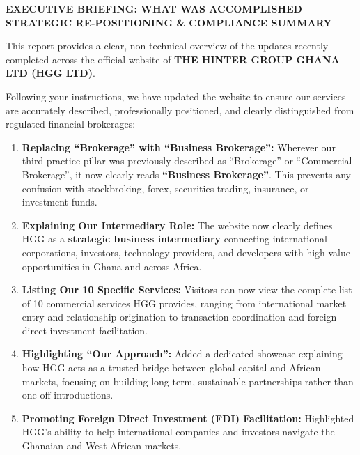 \documentclass[11pt,a4paper]{article}
\begin{document}
\begin{ExecutiveSummaryBox}
\begin{center}
    {\large\bfseries\color{HGGNavy}EXECUTIVE BRIEFING: WHAT WAS ACCOMPLISHED}\\[0.08cm]
    {\small\bfseries\color{HGGGold}STRATEGIC RE-POSITIONING \& COMPLIANCE SUMMARY}
\end{center}
\vspace{0.15cm}
This report provides a clear, non-technical overview of the updates recently completed across the official website of \textbf{THE HINTER GROUP GHANA LTD (HGG LTD)}.

Following your instructions, we have updated the website to ensure our services are accurately described, professionally positioned, and clearly distinguished from regulated financial brokerages:
\begin{enumerate}[leftmargin=*,noitemsep,topsep=2pt]
    \item \textbf{Replacing ``Brokerage'' with ``Business Brokerage'':} Wherever our third practice pillar was previously described as ``Brokerage'' or ``Commercial Brokerage'', it now clearly reads \textbf{``Business Brokerage''}. This prevents any confusion with stockbroking, forex, securities trading, insurance, or investment funds.
    \item \textbf{Explaining Our Intermediary Role:} The website now clearly defines HGG as a \textbf{strategic business intermediary} connecting international corporations, investors, technology providers, and developers with high-value opportunities in Ghana and across Africa.
    \item \textbf{Listing Our 10 Specific Services:} Visitors can now view the complete list of 10 commercial services HGG provides, ranging from international market entry and relationship origination to transaction coordination and foreign direct investment facilitation.
    \item \textbf{Highlighting ``Our Approach'':} Added a dedicated showcase explaining how HGG acts as a trusted bridge between global capital and African markets, focusing on building long-term, sustainable partnerships rather than one-off introductions.
    \item \textbf{Promoting Foreign Direct Investment (FDI) Facilitation:} Highlighted HGG's ability to help international companies and investors navigate the Ghanaian and West African markets.

\end{enumerate}
\end{ExecutiveSummaryBox}
\end{document}
